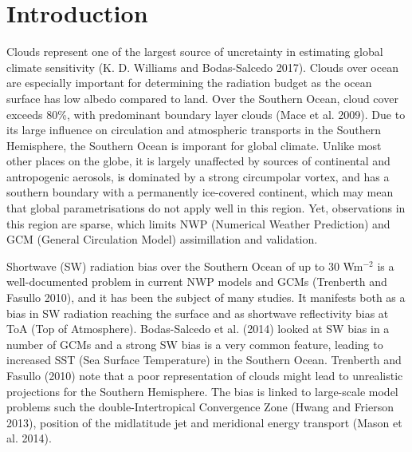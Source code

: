 \chapter{Introduction}

Clouds represent one of the largest source of uncretainty in estimating
global climate sensitivity (K. D. Williams and Bodas-Salcedo 2017).
Clouds over ocean are especially important for determining the radiation
budget as the ocean surface has low albedo compared to land. Over the
Southern Ocean, cloud cover exceeds 80\%, with predominant boundary
layer clouds (Mace et al. 2009). Due to its large influence on
circulation and atmospheric transports in the Southern Hemisphere, the
Southern Ocean is imporant for global climate. Unlike most other places
on the globe, it is largely unaffected by sources of continental and
antropogenic aerosols, is dominated by a strong circumpolar vortex, and
has a southern boundary with a permanently ice-covered continent, which
may mean that global parametrisations do not apply well in this region.
Yet, observations in this region are sparse, which limits NWP (Numerical
Weather Prediction) and GCM (General Circulation Model) assimillation
and validation.

Shortwave (SW) radiation bias over the Southern Ocean of up to 30
Wm$^{-2}$ is a well-documented problem in current NWP models and GCMs
(Trenberth and Fasullo 2010), and it has been the subject of many
studies. It manifests both as a bias in SW radiation reaching the
surface and as shortwave reflectivity bias at ToA (Top of Atmosphere).
Bodas-Salcedo et al. (2014) looked at SW bias in a number of GCMs and a
strong SW bias is a very common feature, leading to increased SST (Sea
Surface Temperature) in the Southern Ocean. Trenberth and Fasullo (2010)
note that a poor representation of clouds might lead to unrealistic
projections for the Southern Hemisphere. The bias is linked to
large-scale model problems such the double-Intertropical Convergence
Zone (Hwang and Frierson 2013), position of the midlatitude jet and
meridional energy transport (Mason et al. 2014).


